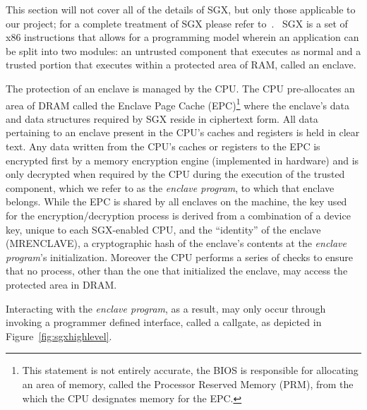 \documentclass[../main.tex]{subfiles}
\begin{document}
This section will not cover all of the details of SGX, but only those
applicable to our project; for a complete treatment of SGX please
refer to~\cite{IntelCorporation2010}. \Intel~SGX is a set of x86
instructions that allows for a programming model wherein an
application can be split into two modules: an untrusted component that
executes as normal and a trusted portion that executes within a
protected area of RAM, called an enclave.

The protection of an enclave is managed by the CPU. The CPU
pre-allocates an area of DRAM called the Enclave Page Cache
(EPC)\footnote{This statement is not entirely accurate, the BIOS is
  responsible for allocating an area of memory, called the Processor
  Reserved Memory (PRM), from the which the CPU designates memory for
  the EPC. } where the enclave's data and data structures required by
SGX reside in ciphertext form. All data pertaining to an enclave
present in the CPU's caches and registers is held in clear text. Any
data written from the CPU's caches or registers to the EPC is
encrypted first by a memory encryption engine (implemented in
hardware) and is only decrypted when required by the CPU during the
execution of the trusted component, which we refer to as the
\textit{enclave program}, to which that enclave belongs. While the EPC
is shared by all enclaves on the machine, the key used for the
encryption/decryption process is derived from a combination of a
device key, unique to each SGX-enabled CPU, and the ``identity'' of
the enclave (MRENCLAVE), a cryptographic hash of the enclave's
contents at the \textit{enclave program}'s initialization. Moreover
the CPU performs a series of checks to ensure that no process, other
than the one that initialized the enclave, may access the protected
area in DRAM.

Interacting with the \textit{enclave program}, as a result, may only
occur through invoking a programmer defined interface, called a
callgate, as depicted in Figure~\ref{fig:sgxhighlevel}.
\end{document}
